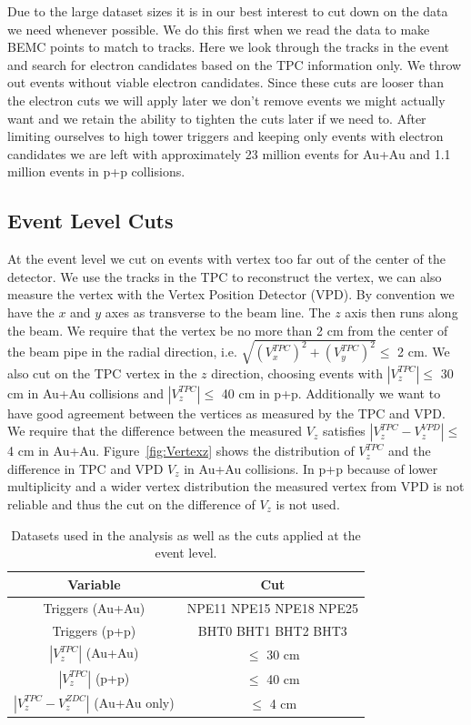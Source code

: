 Due to the large dataset sizes it is in our best interest to cut down on the data we need whenever possible. We do this first when we read the data to make BEMC points to match to tracks. Here we look through the tracks in the event and search for electron candidates based on the TPC information only. We throw out events without viable electron candidates. Since these cuts are looser than the electron cuts we will apply later we don't remove events we might actually want and we retain the ability to tighten the cuts later if we need to. After limiting ourselves to high tower triggers and keeping only events with electron candidates we are left with approximately 23 million events for Au+Au and 1.1 million events in p+p collisions.

\subsection{Event Level Cuts}

At the event level we cut on events with vertex too far out of the center of the detector. We use the tracks in the TPC to reconstruct the vertex, we can also measure the vertex with the Vertex Position Detector (VPD). By convention we have the $x$ and $y$ axes as transverse to the beam line. The $z$ axis then runs along the beam. We require that the vertex be no more than 2 cm from the center of the beam pipe in the radial direction, i.e. $\sqrt{(V_x^{TPC})^2 + (V_y^{TPC})^2} \leq$ 2 cm. We also cut on the TPC vertex in the $z$ direction, choosing events with $|V_z^{TPC}| \leq$ 30 cm in Au+Au collisions and $|V_z^{TPC}| \leq$ 40 cm in p+p. Additionally we want to have good agreement between the vertices as measured by the TPC and VPD. We require that the difference between the measured $V_z$ satisfies $|V_z^{TPC} - V_z^{VPD}| \leq$ 4 cm in Au+Au. Figure~\ref{fig:Vertexz} shows the distribution of $V_z^{TPC}$ and the difference in TPC and VPD $V_z$ in Au+Au collisions. In p+p because of lower multiplicity and a wider vertex distribution the measured vertex from VPD is not reliable and thus the cut on the difference of $V_z$ is not used.

\begin{table}
\centering
\begin{tabular}{|c|c|}
\hline
Variable            & Cut \\
\hline
Triggers (Au+Au)          & NPE11 NPE15 NPE18 NPE25 \\
\hline
Triggers (p+p)          & BHT0 BHT1 BHT2 BHT3 \\
\hline
$|V_z^{TPC}|$  (Au+Au)        & $\leq$ 30 cm \\
\hline
$|V_z^{TPC}|$  (p+p)        & $\leq$ 40 cm \\
\hline
$|V_z^{TPC} - V_z^{ZDC}|$  (Au+Au only)        & $\leq$ 4 cm \\
\hline
\end{tabular}
\caption[Dataset and Event Level Cuts]{Datasets used in the analysis as well as the cuts applied at the event level.}
\label{tab:TPCQual}
\end{table}

